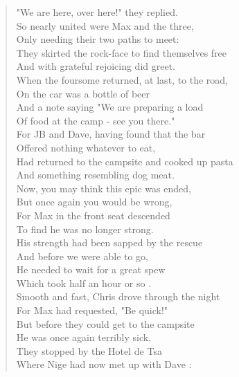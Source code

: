 \documentclass[a5paper,openany,font 10pt]{scrbook}
\begin{document}
\begin{verse}
"We are here, over here!" they replied.\\
\vspace*{1em}
So nearly united were Max and the three,\\
Only needing their two paths to meet:\\
They skirted the rock-face to find themselves free\\
And with grateful rejoicing did greet.\\
\vspace*{1em}
When the foursome returned, at last, to the road,\\
On the car was a bottle of beer\\
And a note saying "We are preparing a load\\
Of food at the camp - see you there."\\
For JB and Dave, having found that the bar\\
Offered nothing whatever to eat,\\
Had returned to the campsite and cooked up pasta\\
And something resembling dog meat.\\
\vspace*{1em}
Now, you may think this epic was ended,\\
But once again you would be wrong,\\
For Max in the front seat descended\\
To find he was no longer strong.\\
\vspace*{1em}
His strength had been sapped by the rescue\\
And before we were able to go,\\
He needed to wait for a great spew\\
\hspace*{1em}Which took half an hour or so .\\
\vspace*{1em}
Smooth and fast, Chris drove through the night\\
\hspace*{1em}For Max had requested, "Be quick!"\\
But before they could get to the campsite\\
He was once again terribly sick.\\
\vspace*{1em}
They stopped by the Hotel de Tsa\\
\hspace*{1em}Where Nige had now met up with Dave :\\

\end{verse}
\end{document}
